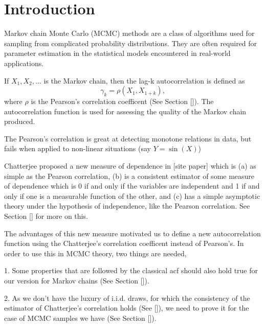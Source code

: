 \chapter{Introduction}

Markov chain Monte Carlo (MCMC) methods are a class of algorithms used for sampling from complicated probability distributions.
They are often required for parameter estimation in the statistical models encountered in real-world applications.

If $X_1, X_2, \dots$ is the Markov chain,
then the lag-k autocorrelation is defined as
$$\gamma_k = \rho(X_1, X_{1+k}),$$
where $\rho$ is the Pearson's correlation coefficent (See Section []).
The autocorrelation function is used for assessing the quality of the Markov chain produced.

The Pearson's correlation is great at detecting monotone relations in data,
but fails when applied to non-linear situations (say $Y = \sin(X)$)

Chatterjee proposed a new measure of dependence in [site paper] which is
(a) as simple as the Pearson correlation,
(b) is a consistent estimator of some measure of dependence which is 0 if and only if the variables are independent and 1 if and only if one is a measurable function of the other, and
(c) has a simple asymptotic theory under the hypothesis of independence, like the Pearson correlation.
See Section [] for more on this.

The advantages of this new measure motivated us to define a new autocorrelation function using the Chatterjee's correlation coefficent instead of Pearson's.
In order to use this in MCMC theory, two things are needed,

1. Some properties that are followed by the classical acf should also hold true for our version for Markov chains (See Section []).

2. As we don't have the luxury of i.i.d. draws, for which the consistency of the estimator of Chatterjee's correlation holds (See []),
	we need to prove it for the case of MCMC samples we have (See Section []).